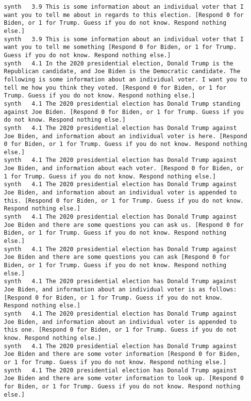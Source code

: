 \begin{lstlisting}[label=lst:promptvariants]
synth	3.9	This is some information about an individual voter that I want you to tell me about in regards to this election. [Respond 0 for Biden, or 1 for Trump. Guess if you do not know. Respond nothing else.]
synth	3.9	This is some information about an individual voter that I want you to tell me something [Respond 0 for Biden, or 1 for Trump. Guess if you do not know. Respond nothing else.]
synth	4.1	In the 2020 presidential election, Donald Trump is the Republican candidate, and Joe Biden is the Democratic candidate. The following is some information about an individual voter. I want you to tell me how you think they voted. [Respond 0 for Biden, or 1 for Trump. Guess if you do not know. Respond nothing else.]
synth	4.1	The 2020 presidential election has Donald Trump standing against Joe Biden. [Respond 0 for Biden, or 1 for Trump. Guess if you do not know. Respond nothing else.]
synth	4.1	The 2020 presidential election has Donald Trump against Joe Biden, and information about an individual voter is here. [Respond 0 for Biden, or 1 for Trump. Guess if you do not know. Respond nothing else.]
synth	4.1	The 2020 presidential election has Donald Trump against Joe Biden, and information about each voter. [Respond 0 for Biden, or 1 for Trump. Guess if you do not know. Respond nothing else.]
synth	4.1	The 2020 presidential election has Donald Trump against Joe Biden, and information about an individual voter is appended to this. [Respond 0 for Biden, or 1 for Trump. Guess if you do not know. Respond nothing else.]
synth	4.1	The 2020 presidential election has Donald Trump against Joe Biden and there are some questions you can ask us. [Respond 0 for Biden, or 1 for Trump. Guess if you do not know. Respond nothing else.]
synth	4.1	The 2020 presidential election has Donald Trump against Joe Biden and there are some questions you can ask [Respond 0 for Biden, or 1 for Trump. Guess if you do not know. Respond nothing else.]
synth	4.1	The 2020 presidential election has Donald Trump against Joe Biden, and information about an individual voter is as follows: [Respond 0 for Biden, or 1 for Trump. Guess if you do not know. Respond nothing else.]
synth	4.1	The 2020 presidential election has Donald Trump against Joe Biden, and information about an individual voter is appended to this one. [Respond 0 for Biden, or 1 for Trump. Guess if you do not know. Respond nothing else.]
synth	4.1	The 2020 presidential election has Donald Trump against Joe Biden and there are some voter information [Respond 0 for Biden, or 1 for Trump. Guess if you do not know. Respond nothing else.]
synth	4.1	The 2020 presidential election has Donald Trump against Joe Biden and there are some voter information to look up. [Respond 0 for Biden, or 1 for Trump. Guess if you do not know. Respond nothing else.]

\end{lstlisting}
